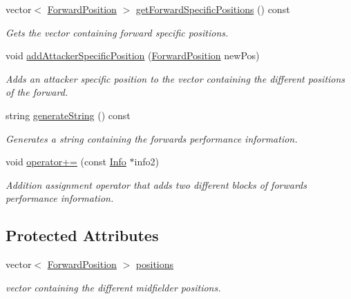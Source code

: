 \begin{DoxyCompactItemize}
vector$<$ \hyperlink{_utils_8hpp_ae6ffae6f01bd3312aac4a44642f14620}{Forward\+Position} $>$ \hyperlink{class_info_f_w_a9bce628dbf938dc530f9333d587b100a}{get\+Forward\+Specific\+Positions} () const
\begin{DoxyCompactList}\small\item\em Gets the vector containing forward specific positions. \end{DoxyCompactList}\item 
void \hyperlink{class_info_f_w_af8af688ba3e796239736dd9ce450991f}{add\+Attacker\+Specific\+Position} (\hyperlink{_utils_8hpp_ae6ffae6f01bd3312aac4a44642f14620}{Forward\+Position} new\+Pos)
\begin{DoxyCompactList}\small\item\em Adds an attacker specific position to the vector containing the different positions of the forward. \end{DoxyCompactList}\item 
string \hyperlink{class_info_f_w_a4c5957205aa850fcdc1d6ba30f085543}{generate\+String} () const
\begin{DoxyCompactList}\small\item\em Generates a string containing the forward\textquotesingle{}s performance information. \end{DoxyCompactList}\item 
void \hyperlink{class_info_f_w_aa4819d4c6348908eee81e5e71552cf8d}{operator+=} (const \hyperlink{class_info}{Info} $\ast$info2)
\begin{DoxyCompactList}\small\item\em Addition assignment operator that adds two different blocks of forward\textquotesingle{}s performance information. \end{DoxyCompactList}\end{DoxyCompactItemize}
\subsection*{Protected Attributes}
\begin{DoxyCompactItemize}
\item 
vector$<$ \hyperlink{_utils_8hpp_ae6ffae6f01bd3312aac4a44642f14620}{Forward\+Position} $>$ \hyperlink{class_info_f_w_ab6a247d57fee089e4a7ad08e798c101b}{positions}
\begin{DoxyCompactList}\small\item\em vector containing the different midfielder positions. \end{DoxyCompactList}\end{DoxyCompactItemize}


